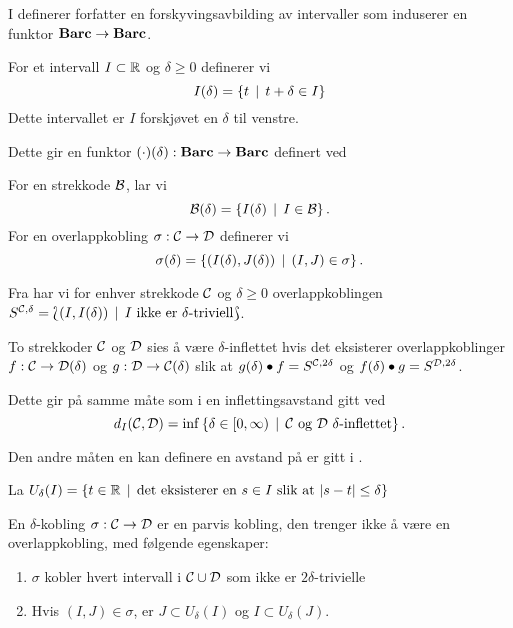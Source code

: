 I \citep[seksjon 2.5]{Bauer2020} definerer forfatter en
forskyvingsavbilding av intervaller som induserer en
funktor $\textnormal{\textbf{Barc}}\to\textnormal{\textbf{Barc}}$.
\begin{definisjon}\label{def:IntSkyv}
    For et intervall $I\subset\mathbb{R}$ og $\delta\geq 0$ definerer vi
    \[I(\delta) = \left\{t\,\mid\,t+\delta\in I\right\}\]
    Dette intervallet er $I$ forskjøvet en $\delta$ til venstre.
\end{definisjon}

Dette gir en funktor $(\cdot)(\delta):\textnormal{\textbf{Barc}}\to\textnormal{\textbf{Barc}}$ definert ved

\begin{definisjon}
    For en strekkode $\mathcal{B}$, lar vi
    \[\mathcal{B}(\delta) = \left\{I(\delta)\,\mid\,I\in\mathcal{B}\right\}.\]
    For en overlappkobling $\sigma:\mathcal{C}\to\mathcal{D}$ definerer vi
    \[\sigma(\delta) = \left\{(I(\delta),J(\delta))\,\mid\,(I,J)\in\sigma\right\}.\]
\end{definisjon}

Fra \cite{Bauer2020} har vi for enhver strekkode $\mathcal{C}$
og $\delta\geq0$ overlappkoblingen $S^{\mathcal{C},\delta}
= \Lbag (I,I(\delta))\,\mid\, \text{$I$ ikke er
$\delta$-triviell}\Rbag$.

\begin{definisjon}\label{def:InfBar}
To strekkoder $\mathcal{C}$ og $\mathcal{D}$ sies å være
  $\delta$-inflettet hvis det eksisterer overlappkoblinger
  $f:\mathcal{C}\to \mathcal{D}(\delta)$ og $g:\mathcal{D}\to\mathcal{C}(\delta)$
  slik at $g(\delta)\bullet f = S^{\mathcal{C},2\delta}$ og
  $f(\delta)\bullet g=S^{\mathcal{D},2\delta}$.
\end{definisjon}

Dette gir på samme måte som i  en inflettingsavstand gitt ved
\[d_I(\mathcal{C},\mathcal{D}) = \inf\left\{\delta\in[0,\infty)\,\mid\,\text{$\mathcal{C}$ og $\mathcal{D}$ $\delta$-inflettet}\right\}.\]

Den andre måten en kan definere en avstand på er gitt
i \cite[seksjon 4.2]{Bauer2020}.

La $U_\delta(I) = \left\{t\in\mathbb{R}\,\mid\,\text{det eksisterer en $s\in I$ slik at }|s-t|\leq\delta\right\}$

\begin{definisjon}\label{def:delta-kobling}
En $\delta$-kobling $\sigma:\mathcal{C}\to \mathcal{D}$ er en parvis kobling, den trenger ikke å være en overlappkobling, med følgende egenskaper:
\begin{enumerate}
    \item $\sigma$ kobler hvert intervall i $\mathcal{C}\cup\mathcal{D}$ som ikke er $2\delta$-trivielle\\
    \item Hvis $(I,J)\in\sigma$, er $J\subset U_\delta(I)$ og $I\subset U_\delta(J)$.
\end{enumerate}
\end{definisjon}

